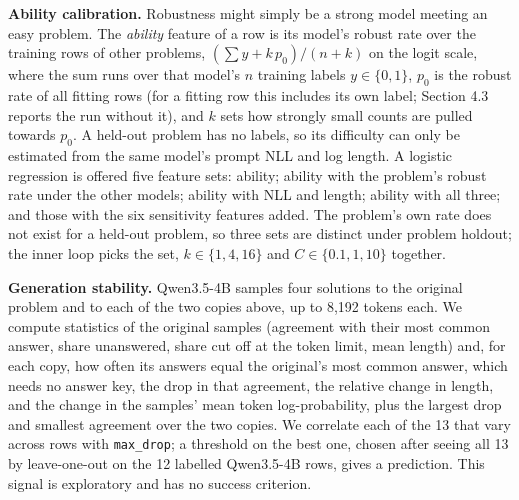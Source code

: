 \documentclass{article}
\begin{document}
\textbf{Ability calibration.} Robustness might simply be a strong model meeting an easy problem. The \emph{ability} feature of a row is its model's robust rate over the training rows of other problems, $(\sum y + k\,p_0)/(n + k)$ on the logit scale, where the sum runs over that model's $n$ training labels $y \in \{0, 1\}$, $p_0$ is the robust rate of all fitting rows (for a fitting row this includes its own label; Section 4.3 reports the run without it), and $k$ sets how strongly small counts are pulled towards $p_0$. A held-out problem has no labels, so its difficulty can only be estimated from the same model's prompt NLL and log length. A logistic regression is offered five feature sets: ability; ability with the problem's robust rate under the other models; ability with NLL and length; ability with all three; and those with the six sensitivity features added. The problem's own rate does not exist for a held-out problem, so three sets are distinct under problem holdout; the inner loop picks the set, $k \in \{1, 4, 16\}$ and $C \in \{0.1, 1, 10\}$ together.

\textbf{Generation stability.} Qwen3.5-4B samples four solutions to the original problem and to each of the two copies above, up to 8,192 tokens each. We compute statistics of the original samples (agreement with their most common answer, share unanswered, share cut off at the token limit, mean length) and, for each copy, how often its answers equal the original's most common answer, which needs no answer key, the drop in that agreement, the relative change in length, and the change in the samples' mean token log-probability, plus the largest drop and smallest agreement over the two copies. We correlate each of the 13 that vary across rows with \texttt{max\_drop}; a threshold on the best one, chosen after seeing all 13 by leave-one-out on the 12 labelled Qwen3.5-4B rows, gives a prediction. This signal is exploratory and has no success criterion.
\end{document}
